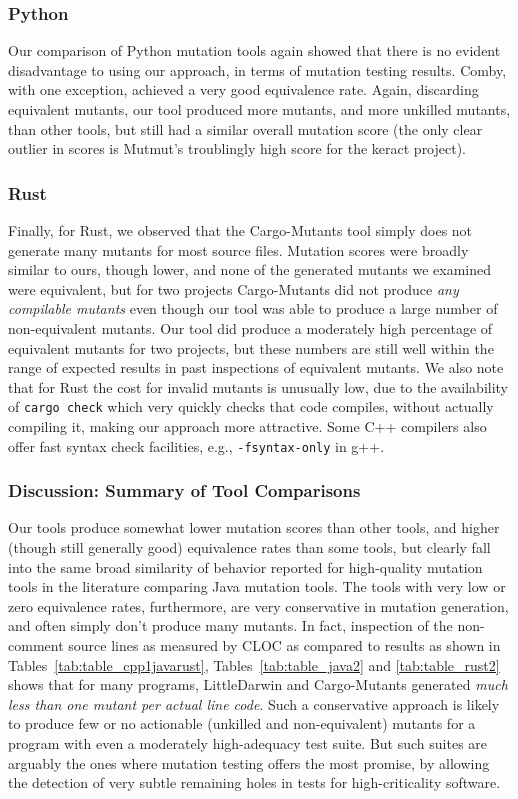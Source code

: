 \documentclass[acmsmall,screen,review,anonymous]{acmart}
\begin{document}
{\subsubsection{Python}

Our comparison of Python mutation tools again showed that there is no
evident disadvantage to
using our approach, in terms of mutation testing results.  Comby, with one
exception, achieved a very good equivalence rate.  Again, discarding
equivalent mutants, our tool produced more mutants, and more unkilled
mutants, than other tools, but still had a similar overall mutation
score (the only clear outlier in scores is Mutmut's troublingly high score for the
keract project). 

\subsubsection{Rust}

Finally, for Rust, we observed that the Cargo-Mutants tool simply does
not generate many mutants for most source files.  Mutation scores were broadly similar to
ours, though lower, and none of the generated mutants we examined were
equivalent, but for two  projects Cargo-Mutants did not produce
\emph{any compilable mutants} even though our tool was able to produce a large
number of non-equivalent mutants.  Our tool did produce a moderately
high 
percentage of equivalent mutants for two  projects, but these numbers are still well
within the range of expected results in past inspections of
equivalent mutants.  We also note  that for Rust the cost for invalid
mutants is unusually low, due to the availability of {\tt cargo check}
which very quickly checks that code compiles, without actually
compiling it, making our approach more attractive.  Some C++ compilers
also offer fast syntax check facilities, e.g., {\tt -fsyntax-only} in g++.

\subsubsection{Discussion: Summary of Tool Comparisons}

Our tools produce somewhat lower mutation scores than other tools, and
higher (though still generally good) equivalence rates than some
tools, but clearly fall into the same broad similarity of behavior
reported for high-quality mutation tools in the literature comparing
Java mutation tools.   The tools with very low or zero equivalence rates, furthermore,
are very conservative in mutation generation, and often simply don't
produce many mutants.  In fact, inspection of the non-comment source
lines as measured by CLOC as compared to results as shown in Tables~\ref{tab:table_cpp1javarust},
Tables~\ref{tab:table_java2} and 
\ref{tab:table_rust2} shows that for many programs, LittleDarwin and
Cargo-Mutants generated \emph{much less than one mutant per actual
  line code}.  Such a conservative approach is likely to produce few
or no actionable (unkilled and non-equivalent) mutants for a program
with even a moderately high-adequacy test suite.  But such suites are
arguably the ones where mutation testing offers the most promise, by
allowing the detection of very subtle remaining holes in tests for
high-criticality software.

}
\end{document}
